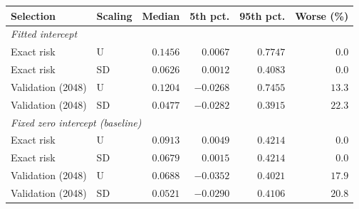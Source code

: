 \begin{tabular}{llrrrr}
\toprule
Selection & Scaling & Median & 5th pct. & 95th pct. & Worse (\%) \\
\midrule
\multicolumn{6}{l}{\emph{Fitted intercept}} \\
Exact risk & U & $0.1456$ & $0.0067$ & $0.7747$ & $0.0$ \\
Exact risk & SD & $0.0626$ & $0.0012$ & $0.4083$ & $0.0$ \\
Validation (2048) & U & $0.1204$ & $-0.0268$ & $0.7455$ & $13.3$ \\
Validation (2048) & SD & $0.0477$ & $-0.0282$ & $0.3915$ & $22.3$ \\
\midrule
\multicolumn{6}{l}{\emph{Fixed zero intercept (baseline)}} \\
Exact risk & U & $0.0913$ & $0.0049$ & $0.4214$ & $0.0$ \\
Exact risk & SD & $0.0679$ & $0.0015$ & $0.4214$ & $0.0$ \\
Validation (2048) & U & $0.0688$ & $-0.0352$ & $0.4021$ & $17.9$ \\
Validation (2048) & SD & $0.0521$ & $-0.0290$ & $0.4106$ & $20.8$ \\
\bottomrule
\end{tabular}
